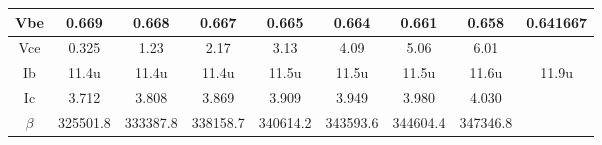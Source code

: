 \begin{table}[h]
\begin{tabular}{|ccccccccc|}
\multicolumn{1}{|c|}{Vbe}     & \multicolumn{1}{c|}{0.669}    & \multicolumn{1}{c|}{0.668}    & \multicolumn{1}{c|}{0.667}    & \multicolumn{1}{c|}{0.665}    & \multicolumn{1}{c|}{0.664}    & \multicolumn{1}{c|}{0.661}    & \multicolumn{1}{c|}{0.658}    & 0.641667 \\ \hline
\multicolumn{1}{|c|}{Vce}     & \multicolumn{1}{c|}{0.325}    & \multicolumn{1}{c|}{1.23}     & \multicolumn{1}{c|}{2.17}     & \multicolumn{1}{c|}{3.13}     & \multicolumn{1}{c|}{4.09}     & \multicolumn{1}{c|}{5.06}     & \multicolumn{1}{c|}{6.01}     &          \\ \hline
\multicolumn{1}{|c|}{Ib}      & \multicolumn{1}{c|}{11.4u}    & \multicolumn{1}{c|}{11.4u}    & \multicolumn{1}{c|}{11.4u}    & \multicolumn{1}{c|}{11.5u}    & \multicolumn{1}{c|}{11.5u}    & \multicolumn{1}{c|}{11.5u}    & \multicolumn{1}{c|}{11.6u}    & 11.9u    \\ \hline
\multicolumn{1}{|c|}{Ic}      & \multicolumn{1}{c|}{3.712}    & \multicolumn{1}{c|}{3.808}    & \multicolumn{1}{c|}{3.869}    & \multicolumn{1}{c|}{3.909}    & \multicolumn{1}{c|}{3.949}    & \multicolumn{1}{c|}{3.980}    & \multicolumn{1}{c|}{4.030}    &          \\ \hline
\multicolumn{1}{|c|}{$\beta$} & \multicolumn{1}{c|}{325501.8} & \multicolumn{1}{c|}{333387.8} & \multicolumn{1}{c|}{338158.7} & \multicolumn{1}{c|}{340614.2} & \multicolumn{1}{c|}{343593.6} & \multicolumn{1}{c|}{344604.4} & \multicolumn{1}{c|}{347346.8} &          \\ \hline
\end{tabular}
\end{table}
\FloatBarrier
